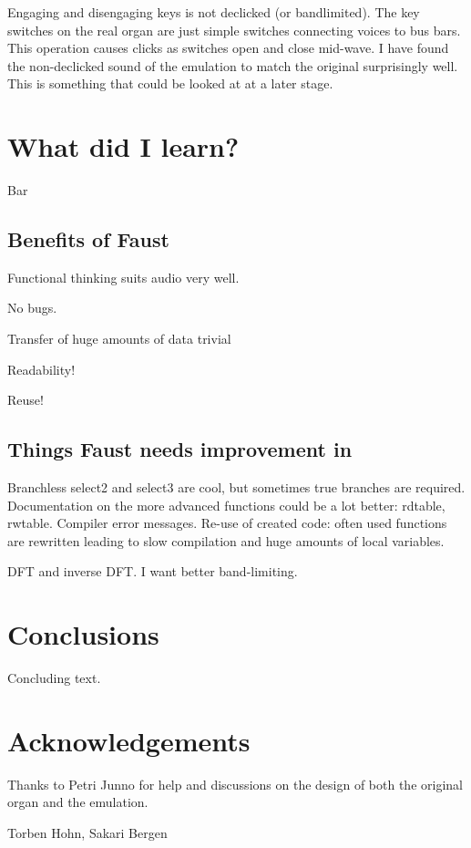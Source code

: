 \documentclass[11pt,a4paper]{article}
\begin{document}
Engaging and disengaging keys is not declicked (or bandlimited). The key switches on the real organ are just simple switches connecting voices to bus bars. This operation causes clicks as switches open and close mid-wave. I have found the non-declicked sound of the emulation to match the original surprisingly well. This is something that could be looked at at a later stage.




\section{What did I learn?}

Bar


\subsection{Benefits of Faust}

Functional thinking suits audio very well.

No bugs.

Transfer of huge amounts of data trivial

Readability!

Reuse!


\subsection{Things Faust needs improvement in}

Branchless select2 and select3 are cool, but sometimes true branches are required.
Documentation on the more advanced functions could be a lot better: rdtable, rwtable.
Compiler error messages.
Re-use of created code: often used functions are rewritten leading to slow compilation and huge amounts of local variables.

DFT and inverse DFT. I want better band-limiting.

\section{Conclusions}

Concluding text.

\section{Acknowledgements}

Thanks to Petri Junno for help and discussions on the design of both the original organ and the emulation.

Torben Hohn, Sakari Bergen





\end{document}
